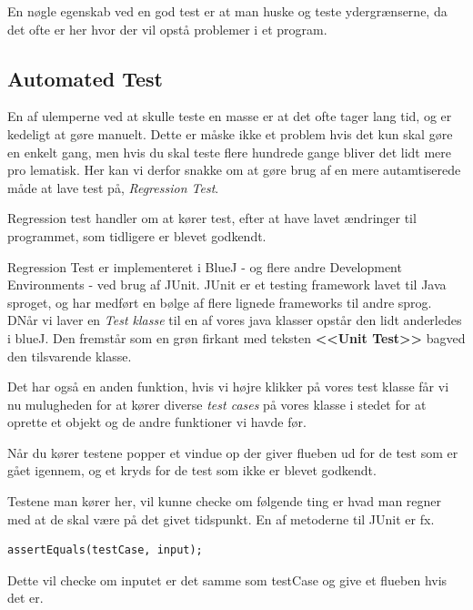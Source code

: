 \documentclass{article}
\begin{document}
En nøgle egenskab ved en god test er at man huske og teste ydergrænserne, da det ofte er her hvor der vil opstå problemer i et program.

\subsection*{Automated Test}
En af ulemperne ved at skulle teste en masse er at det ofte tager lang tid, og er kedeligt at gøre manuelt. Dette er måske ikke et problem hvis det kun skal gøre en enkelt gang, men hvis du skal teste flere hundrede gange bliver det lidt mere pro lematisk. Her kan vi derfor snakke om at gøre brug af en mere autamtiserede måde at lave test på, \textit{Regression Test}.

Regression test handler om at kører test, efter at have lavet ændringer til programmet, som tidligere er blevet godkendt.

Regression Test er implementeret i BlueJ - og flere andre Development Environments - ved brug af JUnit. JUnit er et testing framework lavet til Java sproget, og har medført en bølge af flere lignede frameworks til andre sprog. DNår vi laver en \textit{Test klasse} til en af vores java klasser opstår den lidt anderledes i blueJ. Den fremstår som en grøn firkant med teksten \textbf{\textless \textless Unit Test\textgreater \textgreater} bagved den tilsvarende klasse.

Det har også en anden funktion, hvis vi højre klikker på vores test klasse får vi nu mulugheden for at kører diverse \textit{test cases} på vores klasse i stedet for at oprette et objekt og de andre funktioner vi havde før.

Når du kører testene popper et vindue op der giver flueben ud for de test som er gået igennem, og et kryds for de test som ikke er blevet godkendt. 

Testene man kører her, vil kunne checke om følgende ting er hvad man regner med at de skal være på det givet tidspunkt. En af metoderne til JUnit er fx.
\begin{verbatim}
assertEquals(testCase, input);
\end{verbatim}

Dette vil checke om inputet er det samme som testCase og give et flueben hvis det er.
\end{document}
